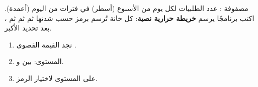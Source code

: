 \begin{statement}
مصفوفة : عدد الطلبيات لكل يوم من الأسبوع (أسطر) في  فترات من اليوم (أعمدة). اكتب برنامجًا يرسم \textbf{خريطة حرارية نصية}: كل خانة تُرسم برمز حسب شدتها  ثم \code{-} ثم \code{+} ثم \code{\#}، بعد تحديد الأكبر.
\end{statement}
\begin{stepsbox}\begin{enumerate}
\item نجد القيمة القصوى .
\item المستوى:  بين  و.
\item {} على المستوى لاختيار الرمز.
\end{enumerate}\end{stepsbox}
